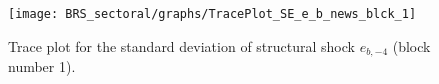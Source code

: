 \begin{figure}[H]
\centering
  \texttt{[image: BRS\_sectoral/graphs/TracePlot\_SE\_e\_b\_news\_blck\_1]}\\
    \caption{Trace plot for the standard deviation of structural shock ${e_{b,-4}}$ (block number 1).}
\end{figure}
